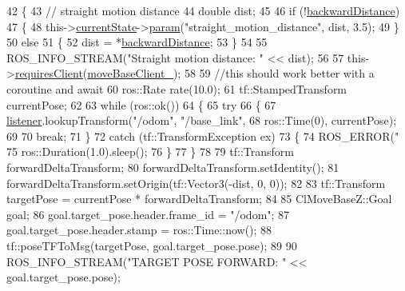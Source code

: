 \begin{DoxyCode}
42     \{
43         \textcolor{comment}{// straight motion distance}
44         \textcolor{keywordtype}{double} dist;
45 
46         \textcolor{keywordflow}{if} (!\hyperlink{classmove__base__z__client_1_1CbNavigateBackwards_a53d06922eff285e4d35f4d7b1b7b7752}{backwardDistance})
47         \{
48             this->\hyperlink{classsmacc_1_1SmaccClientBehavior_af76fc9b877542ed5caf033f820c107d0}{currentState}->\hyperlink{classsmacc_1_1ISmaccState_a4982f2187ed6da337462721146e8ef70}{param}(\textcolor{stringliteral}{"straight\_motion\_distance"}, dist, 3.5);
49         \}
50         \textcolor{keywordflow}{else}
51         \{
52             dist = *\hyperlink{classmove__base__z__client_1_1CbNavigateBackwards_a53d06922eff285e4d35f4d7b1b7b7752}{backwardDistance};
53         \}
54 
55         ROS\_INFO\_STREAM(\textcolor{stringliteral}{"Straight motion distance: "} << dist);
56 
57         this->\hyperlink{classsmacc_1_1SmaccClientBehavior_a917f001e763a1059af337bf4e164f542}{requiresClient}(\hyperlink{classmove__base__z__client_1_1CbNavigateBackwards_a02fb173e95d86f655a1dcf1922db7cec}{moveBaseClient\_});
58 
59         \textcolor{comment}{//this should work better with a coroutine and await}
60         ros::Rate rate(10.0);
61         tf::StampedTransform currentPose;
62 
63         \textcolor{keywordflow}{while} (ros::ok())
64         \{
65             \textcolor{keywordflow}{try}
66             \{
67                 \hyperlink{classmove__base__z__client_1_1CbNavigateBackwards_a13939ba95a738b73e0e26f215791d675}{listener}.lookupTransform(\textcolor{stringliteral}{"/odom"}, \textcolor{stringliteral}{"/base\_link"},
68                                          ros::Time(0), currentPose);
69 
70                 \textcolor{keywordflow}{break};
71             \}
72             \textcolor{keywordflow}{catch} (tf::TransformException ex)
73             \{
74                 ROS\_ERROR(\textcolor{stringliteral}{"%
75                 ros::Duration(1.0).sleep();
76             \}
77         \}
78 
79         tf::Transform forwardDeltaTransform;
80         forwardDeltaTransform.setIdentity();
81         forwardDeltaTransform.setOrigin(tf::Vector3(-dist, 0, 0));
82 
83         tf::Transform targetPose = currentPose * forwardDeltaTransform;
84 
85         ClMoveBaseZ::Goal goal;
86         goal.target\_pose.header.frame\_id = \textcolor{stringliteral}{"/odom"};
87         goal.target\_pose.header.stamp = ros::Time::now();
88         tf::poseTFToMsg(targetPose, goal.target\_pose.pose);
89 
90         ROS\_INFO\_STREAM(\textcolor{stringliteral}{"TARGET POSE FORWARD: "} << goal.target\_pose.pose);
}
\end{DoxyCode}
